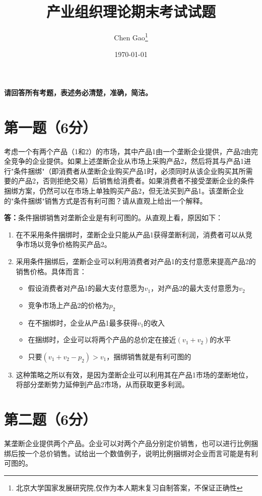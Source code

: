 \documentclass[12pt]{article}
\begin{document}
\title{产业组织理论期末考试试题}
\author{Chen Gao\thanks{北京大学国家发展研究院,仅作为本人期末复习自制答案，不保证正确性}}
\date{\today}
\maketitle




\medskip
\noindent\textbf{请回答所有考题，表述务必清楚，准确，简洁。}

\bigskip
\section*{第一题（6分）}
考虑一个有两个产品（1和2）的市场，其中产品1由一个垄断企业提供，产品2由完全竞争的企业提供。如果上述垄断企业从市场上采购产品2，然后将其与产品1进行"条件捆绑"（即消费者从垄断企业购买产品1时，必须同时从该企业购买其所需要的产品2，否则拒绝交易）后销售给消费者。如果消费者不接受垄断企业的条件捆绑方案，仍然可以在市场上单独购买产品2，但无法买到产品1。该垄断企业的"条件捆绑"销售方式是否有利可图？请从直观上给出一个解释。

\noindent\textbf{答：}条件捆绑销售对垄断企业是有利可图的。从直观上看，原因如下：

\begin{enumerate}
\item 在不采用条件捆绑时，垄断企业只能从产品1获得垄断利润，消费者可以从竞争市场以竞争价格购买产品2。

\item 采用条件捆绑后，垄断企业可以利用消费者对产品1的支付意愿来提高产品2的销售价格。具体而言：
    \begin{itemize}
    \item 假设消费者对产品1的最大支付意愿为$v_1$，对产品2的最大支付意愿为$v_2$
    \item 竞争市场上产品2的价格为$p_2$
    \item 在不捆绑时，企业从产品1最多获得$v_1$的收入
    \item 在捆绑时，企业可以将两个产品的总价定在接近$(v_1+v_2)$的水平
    \item 只要$(v_1+v_2-p_2)>v_1$，捆绑销售就是有利可图的
    \end{itemize}

\item 这种策略之所以有效，是因为垄断企业可以利用其在产品1市场的垄断地位，将部分垄断势力延伸到产品2市场，从而获取更多利润。
\end{enumerate}

\section*{第二题（6分）}
某垄断企业提供两个产品。企业可以对两个产品分别定价销售，也可以进行比例捆绑后按一个总价销售。试给出一个数值例子，说明比例捆绑对企业而言可能是有利可图的。
\end{document}
